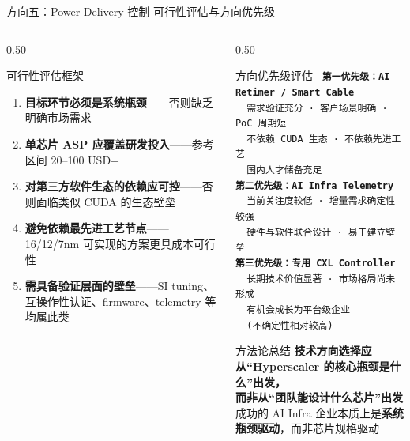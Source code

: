 \documentclass[aspectratio=169, 8pt, UTF8]{ctexbeamer}
\begin{document}
\begin{frame}{方向五：Power Delivery 控制 \quad 可行性评估与方向优先级}
\begin{columns}[T]
\begin{column}{0.50\textwidth}
      \begin{alertblock}{可行性评估框架}
        \begin{enumerate}
          \item \textbf{目标环节必须是系统瓶颈}——否则缺乏明确市场需求
          \item \textbf{单芯片 ASP 应覆盖研发投入}——参考区间 20--100 USD+
          \item \textbf{对第三方软件生态的依赖应可控}——否则面临类似 CUDA 的生态壁垒
          \item \textbf{避免依赖最先进工艺节点}——16/12/7nm 可实现的方案更具成本可行性
          \item \textbf{需具备验证层面的壁垒}——SI tuning、互操作性认证、firmware、telemetry 等均属此类
        \end{enumerate}
      \end{alertblock}
    \end{column}
    \begin{column}{0.50\textwidth}
      \begin{exampleblock}{方向优先级评估}
        \vspace{4pt}
        \texttt{%
        \textbf{第一优先级：AI Retimer / Smart Cable}\\[2pt]
        \ \ 需求验证充分 · 客户场景明确 · PoC 周期短\\[2pt]
        \ \ 不依赖 CUDA 生态 · 不依赖先进工艺\\[2pt]
        \ \ 国内人才储备充足\\[8pt]
        \textbf{第二优先级：AI Infra Telemetry}\\[2pt]
        \ \ 当前关注度较低 · 增量需求确定性较强\\[2pt]
        \ \ 硬件与软件联合设计 · 易于建立壁垒\\[8pt]
        \textbf{第三优先级：专用 CXL Controller}\\[2pt]
        \ \ 长期技术价值显著 · 市场格局尚未形成\\[2pt]
        \ \ 有机会成长为平台级企业\\[2pt]
        \ \ (不确定性相对较高)%
        }
      \end{exampleblock}

      \vspace{6pt}

      \begin{block}{方法论总结}
        \centering
        \textbf{技术方向选择应从``Hyperscaler 的核心瓶颈是什么''出发，}\\[4pt]
        \textbf{而非从``团队能设计什么芯片''出发}\\[4pt]
        成功的 AI Infra 企业本质上是\textbf{系统瓶颈驱动}，而非芯片规格驱动
      \end{block}
    \end{column}
  \end{columns}
\end{frame}
\end{document}
